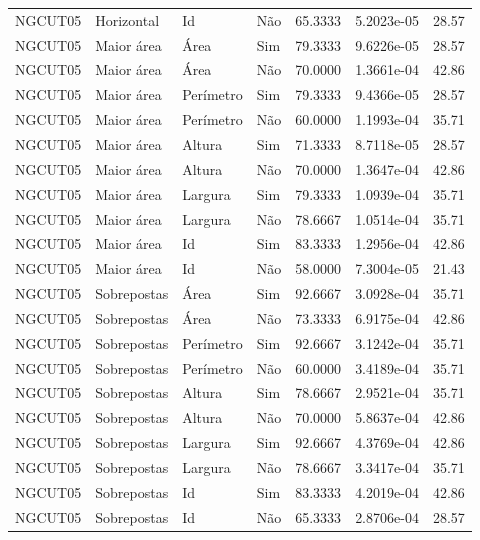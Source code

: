 \begin{tabular}{llllrrr}
NGCUT05   & Horizontal  & Id        & Não         & 65.3333      & 5.2023e-05 & 28.57    \\
NGCUT05   & Maior área  & Área      & Sim         & 79.3333      & 9.6226e-05 & 28.57    \\
NGCUT05   & Maior área  & Área      & Não         & 70.0000      & 1.3661e-04 & 42.86    \\
NGCUT05   & Maior área  & Perímetro & Sim         & 79.3333      & 9.4366e-05 & 28.57    \\
NGCUT05   & Maior área  & Perímetro & Não         & 60.0000      & 1.1993e-04 & 35.71    \\
NGCUT05   & Maior área  & Altura    & Sim         & 71.3333      & 8.7118e-05 & 28.57    \\
NGCUT05   & Maior área  & Altura    & Não         & 70.0000      & 1.3647e-04 & 42.86    \\
NGCUT05   & Maior área  & Largura   & Sim         & 79.3333      & 1.0939e-04 & 35.71    \\
NGCUT05   & Maior área  & Largura   & Não         & 78.6667      & 1.0514e-04 & 35.71    \\
NGCUT05   & Maior área  & Id        & Sim         & 83.3333      & 1.2956e-04 & 42.86    \\
NGCUT05   & Maior área  & Id        & Não         & 58.0000      & 7.3004e-05 & 21.43    \\
NGCUT05   & Sobrepostas & Área      & Sim         & 92.6667      & 3.0928e-04 & 35.71    \\
NGCUT05   & Sobrepostas & Área      & Não         & 73.3333      & 6.9175e-04 & 42.86    \\
NGCUT05   & Sobrepostas & Perímetro & Sim         & 92.6667      & 3.1242e-04 & 35.71    \\
NGCUT05   & Sobrepostas & Perímetro & Não         & 60.0000      & 3.4189e-04 & 35.71    \\
NGCUT05   & Sobrepostas & Altura    & Sim         & 78.6667      & 2.9521e-04 & 35.71    \\
NGCUT05   & Sobrepostas & Altura    & Não         & 70.0000      & 5.8637e-04 & 42.86    \\
NGCUT05   & Sobrepostas & Largura   & Sim         & 92.6667      & 4.3769e-04 & 42.86    \\
NGCUT05   & Sobrepostas & Largura   & Não         & 78.6667      & 3.3417e-04 & 35.71    \\
NGCUT05   & Sobrepostas & Id        & Sim         & 83.3333      & 4.2019e-04 & 42.86    \\
NGCUT05   & Sobrepostas & Id        & Não         & 65.3333      & 2.8706e-04 & 28.57    \\
\hline
\end{tabular}
